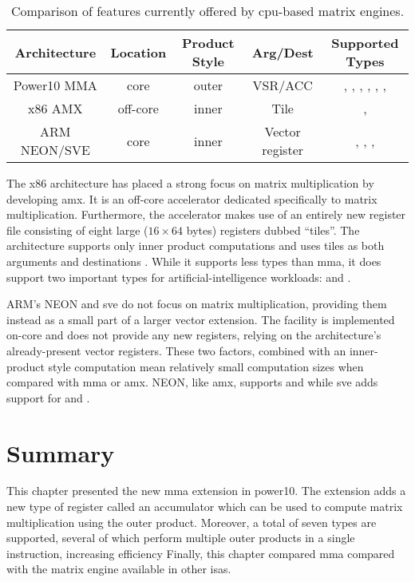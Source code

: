 \documentclass[\main/thesis.tex]{subfiles}
\begin{document}
\begin{table}
  \centering
  \begin{tabular}{| c | c | c | c | c |}
    \hline
    Architecture & Location & \parbox[t][28pt][t]{40pt}{\centering Product Style} & Arg/Dest & Supported Types\\\hline
    \parbox[t][][t]{40pt}{\centering Power10 MMA} & core & outer & VSR/ACC & \parbox[t][40pt][t]{3.2cm}{\raggedright{}, , , , , , }\\\hline
    x86 AMX & off-core & inner & Tile &\parbox[t][11pt][t]{3.3cm}{\raggedright{}, }\\\hline
    \parbox[t][][t]{60pt}{\centering ARM NEON/SVE} & core & inner & Vector register & \parbox[t][25pt][t]{3.3cm}{\raggedright{}, , , }\\\hline
  \end{tabular}
  \caption[Matrix Engine Feature Comparison]{Comparison of features currently offered by cpu-based matrix engines.}
  \label{tab:featComp}
\end{table}

The x86 architecture has placed a strong focus on matrix multiplication by developing \gls{amx}.
It is an off-core accelerator dedicated specifically to matrix multiplication.
Furthermore, the accelerator makes use of an entirely new register file consisting of eight large ($16 \times 64$ bytes) registers dubbed ``tiles''.
The architecture supports only inner product computations and uses tiles as both arguments and destinations .
While it supports less types than \gls{mma}, it does support two important types for artificial-intelligence workloads:  and .

ARM's NEON and \gls{sve} do not focus on matrix multiplication, providing them instead as a small part of a larger vector extension.
The facility is implemented on-core and does not provide any new registers, relying on the architecture's already-present vector registers.
These two factors, combined with an inner-product style computation mean relatively small computation sizes when compared with \gls{mma} or \gls{amx}.
NEON, like \gls{amx}, supports  and  while \gls{sve} adds support for  and .

\section{Summary}
This chapter presented the new \gls{mma} extension in \gls{power10}.
The extension adds a new type of register called an accumulator which can be used to compute matrix multiplication using the outer product.
Moreover, a total of seven types are supported, several of which perform multiple outer products in a single instruction, increasing efficiency
Finally, this chapter compared \gls{mma} compared with the \gls{matrix engine} available in other \glspl{isa}.
\end{document}
